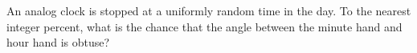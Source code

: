 An analog clock is stopped at a uniformly random time in the day. To the nearest integer percent, what is the chance that the angle between the minute hand and hour hand is obtuse?
